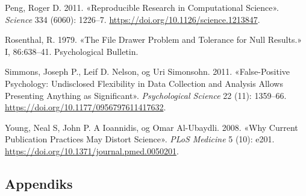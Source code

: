 \documentclass[
  12pt,
  norsk,
]{article}
\begin{document}
\leavevmode\hypertarget{ref-peng2011}{}%
Peng, Roger D. 2011. «Reproducible Research in Computational Science».
\emph{Science} 334 (6060): 1226--7.
\url{https://doi.org/10.1126/science.1213847}.

\leavevmode\hypertarget{ref-rosenthal1979}{}%
Rosenthal, R. 1979. «The File Drawer Problem and Tolerance for Null
Results.» I, 86:638--41. Psychological Bulletin.

\leavevmode\hypertarget{ref-simmons2011}{}%
Simmons, Joseph P., Leif D. Nelson, og Uri Simonsohn. 2011.
«False-Positive Psychology: Undisclosed Flexibility in Data Collection
and Analysis Allows Presenting Anything as Significant».
\emph{Psychological Science} 22 (11): 1359--66.
\url{https://doi.org/10.1177/0956797611417632}.

\leavevmode\hypertarget{ref-young2008}{}%
Young, Neal S, John P. A Ioannidis, og Omar Al-Ubaydli. 2008. «Why
Current Publication Practices May Distort Science». \emph{PLoS Medicine}
5 (10): e201. \url{https://doi.org/10.1371/journal.pmed.0050201}.

\hypertarget{appendiks}{%
\subsection{Appendiks}\label{appendiks}}
\end{document}
